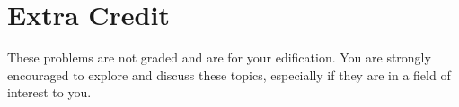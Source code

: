 \documentclass[12pt]{article}
\numberwithin{equation}{subsection}    %
\begin{document}
%
%
%
%
%








\section{Extra Credit}

These problems are not graded and are for your edification. You are strongly encouraged to explore and discuss these topics, especially if they are in a field of interest to you.
\end{document}

